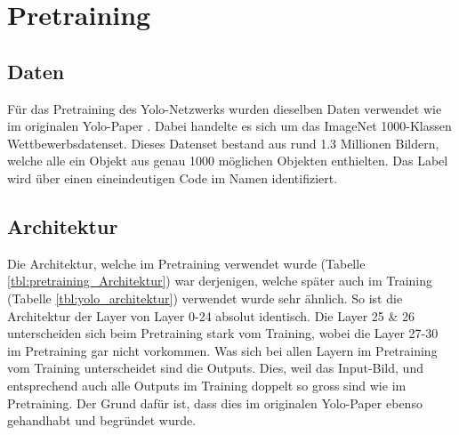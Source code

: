 \newpage
\section{Pretraining}
\label{chapter:Pretraining}

\subsection{Daten}
Für das Pretraining des Yolo-Netzwerks wurden dieselben Daten verwendet wie im originalen Yolo-Paper \cite{yolo}.
Dabei handelte es sich um das ImageNet 1000-Klassen Wettbewerbsdatenset.
Dieses Datenset bestand aus rund 1.3 Millionen Bildern, welche alle ein Objekt aus genau 1000 möglichen Objekten enthielten.
Das Label wird über einen eineindeutigen Code im Namen identifiziert.
\subsection{Architektur}
Die Architektur, welche im Pretraining verwendet wurde (Tabelle \ref{tbl:pretraining_Architektur}) war derjenigen, welche später auch im Training (Tabelle \ref{tbl:yolo_architektur}) verwendet wurde sehr ähnlich.
So ist die Architektur der Layer von Layer 0-24 absolut identisch. 
Die Layer 25 \& 26 unterscheiden sich beim Pretraining stark vom Training, wobei die Layer 27-30 im Pretraining gar nicht vorkommen.
Was sich bei allen Layern im Pretraining vom Training unterscheidet sind die Outputs. 
Dies, weil das Input-Bild, und entsprechend auch alle Outputs im Training doppelt so gross sind wie im Pretraining. 
Der Grund dafür ist, dass dies im originalen Yolo-Paper \cite{yolo} ebenso gehandhabt und begründet wurde.

